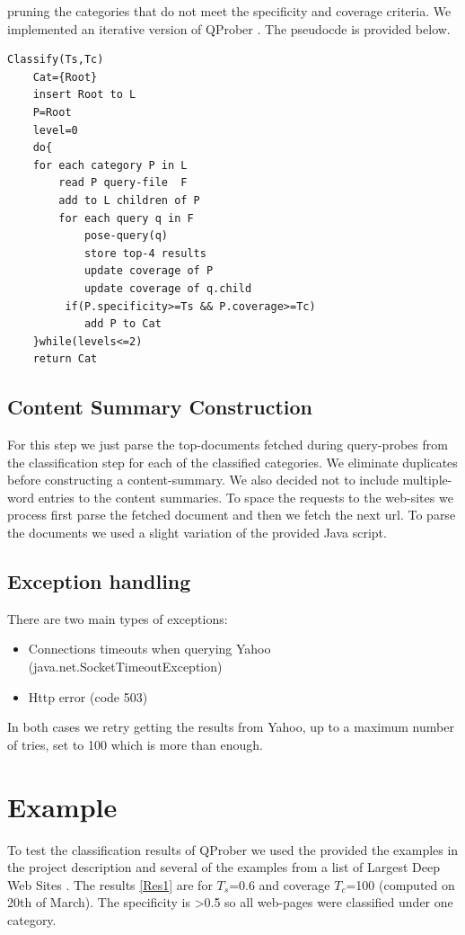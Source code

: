 \documentclass[11pt]{article}
\begin{document}
pruning the categories that do not meet the specificity and coverage criteria. We implemented an iterative version of QProber \cite{QProb}. The pseudocde is provided below.

\begin{verbatim}
Classify(Ts,Tc)
    Cat={Root}
    insert Root to L
    P=Root
    level=0
    do{
    for each category P in L
        read P query-file  F
        add to L children of P
        for each query q in F
            pose-query(q)
            store top-4 results
            update coverage of P 
            update coverage of q.child
         if(P.specificity>=Ts && P.coverage>=Tc)
            add P to Cat
    }while(levels<=2)
    return Cat
\end{verbatim}

\subsection{Content Summary Construction}
For this step we just parse the top-documents fetched during query-probes from the classification step for each of the classified categories. We eliminate duplicates before constructing 
a content-summary. We also decided not to include multiple-word entries to the content summaries. To space the requests to the web-sites we process first parse the fetched document and then we fetch
the next url. To parse the documents we used a slight variation of the provided Java script.

\subsection{Exception handling}
There are two main types of exceptions:

\begin{itemize}
\item Connections timeouts when querying Yahoo (java.net.SocketTimeoutException)
\item Http error (code 503)
\end{itemize}

In both cases we retry getting the results from Yahoo, up to a maximum number of tries, set to 100 which is more than enough.

\section{Example}
To test the classification results of QProber we used the provided the examples in the project description and several of the examples from a list
of Largest Deep Web Sites \cite{AIP}. The results \ref{Res1} are for $T_s$=0.6 and coverage $T_c$=100  (computed on 20th of March). The specificity
is >0.5 so all web-pages were classified under one category.
\end{document}
